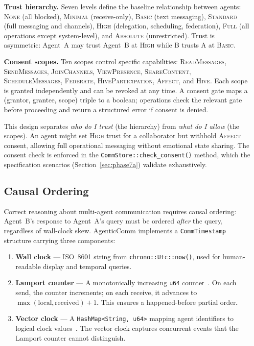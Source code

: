 \documentclass[10pt, twocolumn]{article}
\begin{document}
\textbf{Trust hierarchy.} Seven levels define the baseline relationship between agents: \textsc{None} (all blocked), \textsc{Minimal} (receive-only), \textsc{Basic} (text messaging), \textsc{Standard} (full messaging and channels), \textsc{High} (delegation, scheduling, federation), \textsc{Full} (all operations except system-level), and \textsc{Absolute} (unrestricted). Trust is asymmetric: Agent~A may trust Agent~B at \textsc{High} while B trusts A at \textsc{Basic}.

\textbf{Consent scopes.} Ten scopes control specific capabilities: \textsc{ReadMessages}, \textsc{SendMessages}, \textsc{JoinChannels}, \textsc{ViewPresence}, \textsc{ShareContent}, \textsc{ScheduleMessages}, \textsc{Federate}, \textsc{HiveParticipation}, \textsc{Affect}, and \textsc{Hive}. Each scope is granted independently and can be revoked at any time. A consent gate maps a (grantor, grantee, scope) triple to a boolean; operations check the relevant gate before proceeding and return a structured error if consent is denied.

This design separates \emph{who do I trust} (the hierarchy) from \emph{what do I allow} (the scopes). An agent might set \textsc{High} trust for a collaborator but withhold \textsc{Affect} consent, allowing full operational messaging without emotional state sharing. The consent check is enforced in the \texttt{CommStore::check\_consent()} method, which the specification scenarios (Section~\ref{sec:phase7a}) validate exhaustively.


\subsection{Causal Ordering}
\label{sec:ordering}

Correct reasoning about multi-agent communication requires causal ordering: Agent~B's response to Agent~A's query must be ordered \emph{after} the query, regardless of wall-clock skew. AgenticComm implements a \texttt{CommTimestamp} structure carrying three components:

\begin{enumerate}[nosep, leftmargin=*]
  \item \textbf{Wall clock} --- ISO~8601 string from \texttt{chrono::Utc::now()}, used for human-readable display and temporal queries.
  \item \textbf{Lamport counter} --- A monotonically increasing \texttt{u64} counter~\cite{lamport1978time}. On each send, the counter increments; on each receive, it advances to $\max(\text{local}, \text{received}) + 1$. This ensures a happened-before partial order.
  \item \textbf{Vector clock} --- A \texttt{HashMap<String, u64>} mapping agent identifiers to logical clock values~\cite{mattern1989virtual}. The vector clock captures concurrent events that the Lamport counter cannot distinguish.
\end{enumerate}
\end{document}
